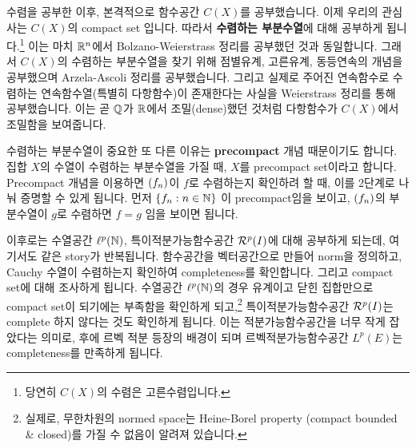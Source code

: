 수렴을 공부한 이후, 본격적으로 함수공간 \(C(X)\)를 공부했습니다. 이제 우리의 관심사는 \(C(X)\)의 compact set 입니다. 따라서 \textbf{수렴하는 부분수열}에 대해 공부하게 됩니다.\footnote{당연히 \(C(X)\)의 수렴은 고른수렴입니다.} 이는 마치 \(\mathbb{R}^n\)에서 Bolzano-Weierstrass 정리를 공부했던 것과 동일합니다. 그래서 \(C(X)\)의 수렴하는 부분수열을 찾기 위해 점별유계, 고른유계, 동등연속의 개념을 공부했으며 Arzela-Ascoli 정리를 공부했습니다. 그리고 실제로 주어진 연속함수로 수렴하는 연속함수열(특별히 다항함수)이 존재한다는 사실을 Weierstrass 정리를 통해 공부했습니다. 이는 곧 \(\mathbb{Q}\)가 \(\mathbb{R}\)에서 조밀(dense)했던 것처럼 다항함수가 \(C(X)\)에서 조밀함을 보여줍니다.

수렴하는 부분수열이 중요한 또 다른 이유는 \textbf{precompact} 개념 때문이기도 합니다. 집합 \(X\)의 수열이 수렴하는 부분수열을 가질 때, \(X\)를 precompact set이라고 합니다. Precompact 개념을 이용하면 \(\left( f_n \right)\)이 \(f\)로 수렴하는지 확인하려 할 때, 이를 2단계로 나눠 증명할 수 있게 됩니다. 먼저 \(\{f_n : n \in \mathbb{N}\}\) 이 precompact임을 보이고, \(\left( f_n \right)\)의 부분수열이 \(g\)로 수렴하면 \(f = g\) 임을 보이면 됩니다.

이후로는 수열공간 \(\ell^p(\mathbb{N})\), 특이적분가능함수공간 \(\mathcal{R}^p(I)\)에 대해 공부하게 되는데, 여기서도 같은 story가 반복됩니다. 함수공간을 벡터공간으로 만들어 norm을 정의하고, Cauchy 수열이 수렴하는지 확인하여 completeness를 확인합니다. 그리고 compact set에 대해 조사하게 됩니다. 수열공간 \(\ell^p(\mathbb{N})\)의 경우 유계이고 닫힌 집합만으로 compact set이 되기에는 부족함을 확인하게 되고,\footnote{실제로, 무한차원의 normed space는 Heine-Borel property (compact \miff bounded \& closed)를 가질 수 없음이 알려져 있습니다.} 특이적분가능함수공간 \(\mathcal{R}^p(I)\)는 complete 하지 않다는 것도 확인하게 됩니다. 이는 적분가능함수공간을 너무 작게 잡았다는 의미로, 후에 르벡 적분 등장의 배경이 되며 르벡적분가능함수공간 \(L^p(E)\)는 completeness를 만족하게 됩니다.

\pagebreak
